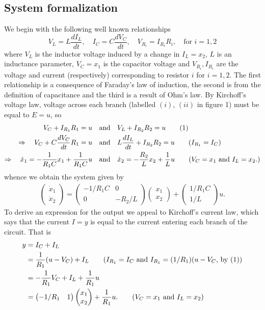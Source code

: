 \documentclass[11pt, letterpaper]{article}
\begin{document}
\subsection*{System formalization}
We begin with the following well known relationships
\[V_L=L\frac{dI_L}{dt},\quad I_C=C\frac{dV_C}{dt},\quad V_{R_i}=I_{R_i}R_i,\quad\text{for $i=1,2$}\]
where $V_L$ is the inductor voltage induced by a change in $I_L=x_2$, $L$ is an inductance parameter, $V_C=x_1$ is the capacitor voltage and $V_{R_i}, I_{R_i}$ are the voltage and current (respectively) corresponding to resistor $i$ for $i=1,2$. The first relationship is a consequence of Faraday's law of induction, the second is from the definition of capacitance and the third is a result of Ohm's law. By Kirchoff's voltage law, voltage across each branch (labelled $(i)$, $(ii)$ in figure 1) must be equal to $E=u$, so
\begin{align*}
    V_C+I_{R_1}R_1=u\quad&\text{and}\quad V_L+I_{R_2}R_2=u\tag{1}\\
    \Rightarrow\quad V_C+C\frac{dV_C}{dt}R_1=u\quad&\text{and}\quad L\frac{dI_L}{dt}+I_{R_2}R_2=u\tag{$I_{R_1}=I_C$}\\
    \Rightarrow\quad \dot{x}_1=-\frac{1}{R_1C}x_1+\frac{1}{R_1C}u\quad&\text{and}\quad \dot{x}_2=-\frac{R_2}{L}x_2+\frac{1}{L}u\tag{$V_C=x_1$ and $I_L=x_2$.}
\end{align*}
whence we obtain the system given by
\begin{align*}
    \begin{pmatrix}
        \dot{x}_1\\
        \dot{x}_2
    \end{pmatrix}=\begin{pmatrix}
        -1/R_1C & 0\\
        0 & -R_2/L
    \end{pmatrix}\begin{pmatrix}
        x_1\\
        x_2
    \end{pmatrix}+\begin{pmatrix}
        1/R_1C\\
        1/L
    \end{pmatrix}u.
\end{align*}
To derive an expression for the output we appeal to Kirchoff's current law, which says that the current $I=y$ is equal to the current entering each branch of the circuit. That is
\begin{align*}
    y&=I_C+I_L\\
    &=\frac{1}{R_1}(u-V_C)+I_L\tag{$I_{R_1}=I_C$ and $I_{R_1}=(1/R_1)(u-V_C$, by (1)}\\
    &=-\frac{1}{R_1}V_C+I_L+\frac{1}{R_1}u\\
    &=\begin{pmatrix}
        -1/R_1 & 1
    \end{pmatrix}\begin{pmatrix}
        x_1\\
        x_2
    \end{pmatrix}+\frac{1}{R_1}u.\tag{$V_C=x_1$ and $I_L=x_2$}
\end{align*}
\end{document}
